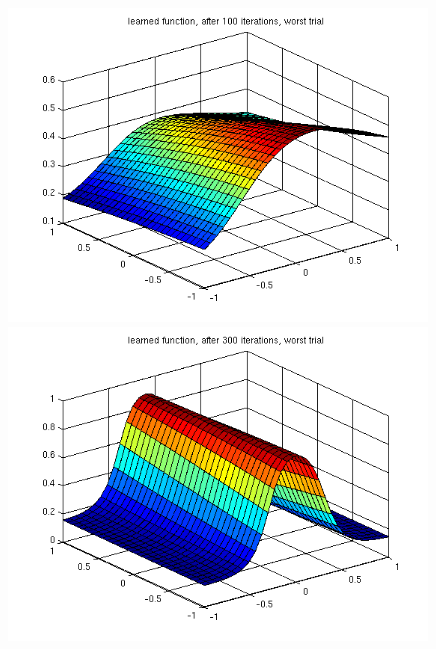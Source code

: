 \begin{figure}[hp!]
\begin{center}
\begin{minipage}{0.48\textwidth}
 \end{minipage}
 \begin{minipage}{0.48\textwidth}
 \includegraphics[width=0.99\textwidth]{./figures/1/learned_worst_100}
 \end{minipage}
 \begin{minipage}{0.48\textwidth}
 \includegraphics[width=0.99\textwidth]{./figures/1/learned_worst_300}
 \end{minipage}
 \begin{minipage}{0.48\textwidth}

\end{minipage}
\end{center}
\end{figure}
